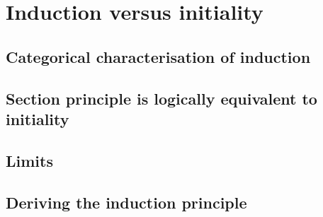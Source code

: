 \chapter{Induction versus initiality}

\section{Categorical characterisation of induction}

\section{Section principle is logically equivalent to initiality}

\section{Limits}

\section{Deriving the induction principle}
